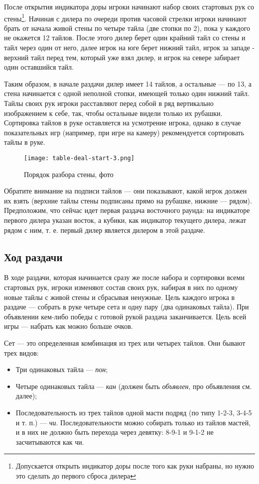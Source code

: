 После открытия индикатора доры игроки начинают набор своих стартовых рук со стены\footnote{Допускается открыть индикатор доры после того как руки набраны, но нужно это сделать до первого сброса дилера}. Начиная с дилера по очереди против часовой стрелки игроки начинают брать от начала живой стены по четыре тайла (две стопки по 2), пока у каждого не окажется 12 тайлов.
После этого дилер берет один крайний тайл со стены и тайл через один от него, далее игрок на юге берет нижний тайл, игрок за западе - верхний тайл перед тем, который уже взял дилер, и игрок на севере забирает один оставшийся тайл. 

Таким образом, в начале раздачи дилер имеет 14 тайлов, а остальные --- по 13, а стена начинается с одной неполной стопки, имеющей только один нижний тайл. Тайлы своих рук игроки расставляют перед собой в ряд вертикально изображением к себе, так, чтобы остальные видели только их рубашки. Сортировка тайлов в руке оставляется на усмотрение игрока, однако в случае показательных игр (например, при игре на камеру) рекомендуется сортировать тайлы в руке.

\begin{figure}[H]
	\centering
	\texttt{[image: table-deal-start-3.png]}
	\caption{Порядок разбора стены, фото}
\end{figure}

Обратите внимание на подписи тайлов --- они показывают, какой игрок должен их взять (верхние тайлы стены подписаны прямо на рубашке, нижние --- рядом). Предположим, что сейчас идет первая раздача восточного раунда: на индикаторе первого дилера указан восток, а кубики, как индикатор текущего дилера, лежат рядом с ним, т. е. первый дилер является дилером в этой раздаче.

\subsection{Ход раздачи}

В ходе раздачи, которая начинается сразу же после набора и сортировки всеми стартовых рук, игроки изменяют состав своих рук, набирая в них по одному новые тайлы с живой стены и сбрасывая ненужные. Цель каждого игрока в раздаче --- собрать в руке четыре сета и одну пару (два одинаковых тайла). При объявлении кем-либо победы с готовой рукой раздача заканчивается. Цель всей игры --- набрать как можно больше очков.

Сет --- это определенная комбинация из трех или четырех тайлов. Они бывают трех видов:
\begin{itemize}
	\item Три одинаковых тайла --- \textit{пон};
	\item Четыре одинаковых тайла --- \textit{кан} (должен быть \textit{объявлен}, про объявления см. далее);
	\item Последовательность из трех тайлов одной масти подряд (по типу 1-2-3, 3-4-5 и т. п.) --- \textit{чи}. Последовательности можно собирать только из тайлов мастей, и в них не должно быть перехода через девятку: 8-9-1 и 9-1-2 не засчитываются как чи.
\end{itemize}

